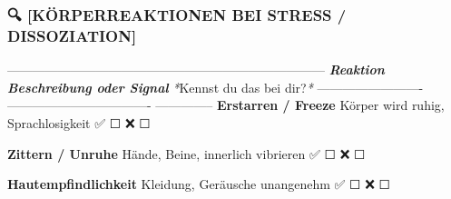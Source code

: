 \subsubsection{\textbf{🔍 [KÖRPERREAKTIONEN BEI STRESS / DISSOZIATION]}}

---------------------------------------------------------------------------
\textbf{\textit{Reaktion}}            \textbf{\textit{Beschreibung oder Signal}}     \textit{*}Kennst du
das bei
dir?\textit{*}
------------------------- ---------------------------------- --------------
\textbf{Erstarren / Freeze}    Körper wird ruhig, Sprachlosigkeit ✅ ☐ ❌ ☐

\textbf{Zittern / Unruhe}      Hände, Beine, innerlich vibrieren  ✅ ☐ ❌ ☐

\textbf{Hautempfindlichkeit}   Kleidung, Geräusche unangenehm     ✅ ☐ ❌ ☐

